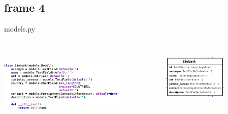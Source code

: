 \documentclass[xcolor=x11names,compress]{beamer}
\renewcommand{\(}{\begin{columns}}
\renewcommand{\)}{\end{columns}}
\newcommand{\<}[1]{\begin{column}{#1}}
\renewcommand{\>}{\end{column}}
\begin{document}
\subsection{frame 4}
\begin{frame}{models.py}

\begin{columns}[T]
 \begin{column}{.6\textwidth}
  \begin{block}{}
    \includegraphics[width=6cm, height=4cm]{images/biobank.png}
  \end{block}
 \end{column}
 \begin{column}{.4\textwidth}
  \begin{block}{}
   \includegraphics[width=3cm, height=3cm]{images/erbiobank.png}
  \end{block}
 \end{column}
\end{columns}

\end{frame}

\end{document}
